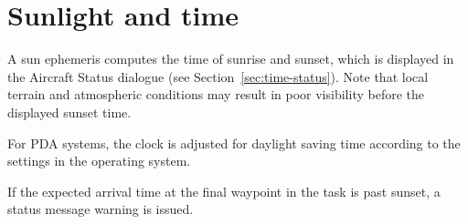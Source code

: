 \section{Sunlight and time}

A sun ephemeris computes the time of sunrise and sunset, which is displayed in the
Aircraft Status dialogue (see Section~\ref{sec:time-status}).  Note that
local terrain and atmospheric conditions may result in poor visibility
before the displayed sunset time.

For PDA systems, the clock is adjusted for daylight saving time according
to the settings in the operating system.

If the expected arrival time at the final waypoint in the task is past
sunset, a status message warning is issued.
